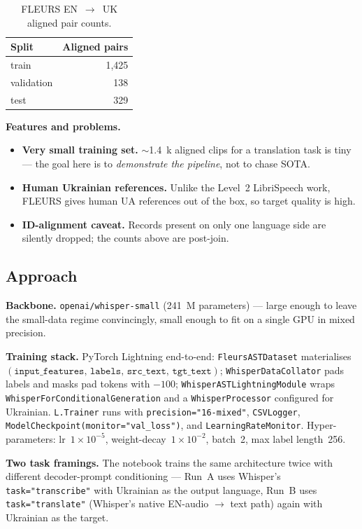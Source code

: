 \documentclass[11pt]{article}
\begin{document}
\begin{table}[h]
\centering
\begin{tabular}{lr}
\toprule
\textbf{Split} & \textbf{Aligned pairs} \\
\midrule
train       & 1{,}425 \\
validation  & 138 \\
test        & 329 \\
\bottomrule
\end{tabular}
\caption{FLEURS EN~$\rightarrow$~UK aligned pair counts.}
\end{table}

\noindent\textbf{Features and problems.}
\begin{itemize}
    \item \textbf{Very small training set.} $\sim$1.4~k aligned clips for a
    translation task is tiny --- the goal here is to \emph{demonstrate the
    pipeline}, not to chase SOTA.
    \item \textbf{Human Ukrainian references.} Unlike the Level~2 LibriSpeech
    work, FLEURS gives human UA references out of the box, so target quality
    is high.
    \item \textbf{ID-alignment caveat.} Records present on only one language
    side are silently dropped; the counts above are post-join.
\end{itemize}

\subsection{Approach}
\textbf{Backbone.} \texttt{openai/whisper-small} (241~M parameters) --- large
enough to leave the small-data regime convincingly, small enough to fit on a
single GPU in mixed precision.

\noindent\textbf{Training stack.} PyTorch Lightning end-to-end:
\texttt{FleursASTDataset} materialises
$(\texttt{input\_features},\,\texttt{labels},\,\texttt{src\_text},\,\texttt{tgt\_text})$;
\texttt{WhisperDataCollator} pads labels and masks pad tokens with $-100$;
\texttt{WhisperASTLightningModule} wraps \texttt{WhisperForConditionalGeneration}
and a \texttt{WhisperProcessor} configured for Ukrainian.
\texttt{L.Trainer} runs with \texttt{precision="16-mixed"}, \texttt{CSVLogger},
\texttt{ModelCheckpoint(monitor="val\_loss")}, and \texttt{LearningRateMonitor}.
Hyper-parameters: lr~$1\!\times\!10^{-5}$, weight-decay~$1\!\times\!10^{-2}$,
batch~2, max label length~256.

\noindent\textbf{Two task framings.} The notebook trains the same architecture
twice with different decoder-prompt conditioning ---
Run~A uses Whisper's \texttt{task="transcribe"} with Ukrainian as the output
language, Run~B uses \texttt{task="translate"} (Whisper's native EN-audio
$\rightarrow$ text path) again with Ukrainian as the target.
\end{document}
